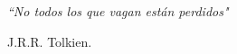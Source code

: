 \cleardoublepage %
\chapter*{}
\setlength{\leftmargin}{0.5\textwidth}
\setlength{\parsep}{0cm}
\addtolength{\topsep}{0.5cm}
\begin{flushright}
\small\em{
``No todos los que vagan están perdidos"
}
\end{flushright}
\begin{flushright}
\small{
J.R.R. Tolkien.
}
\end{flushright}
\cleardoublepage %
